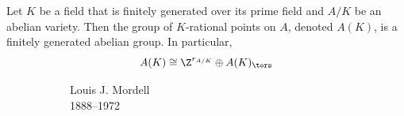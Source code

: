 \begin{frame}[plain]
	\begin{thm}
	Let $K$ be a field that is finitely generated over its prime field and $A/K$ be an abelian variety. Then the group of $K$-rational points on $A$, denoted $A(K)$, is a finitely generated abelian group. In particular,
		\[
		A(K) \cong \Z^{r_{A/K}} \oplus A(K)_\tors
		\]
	\end{thm}
	\begin{figure}[h]
	\centering
	\begin{subfigure}{0.3\textwidth}
	\captionsetup{labelformat=empty}
	\centering
	\caption{\hspace{0.5cm}Louis J. Mordell \\ \hspace{0.8cm}1888--1972}
	\end{subfigure}
	\begin{subfigure}{0.3\textwidth}
	\captionsetup{labelformat=empty}
	\centering

\end{subfigure}
\end{figure}
\end{frame}
